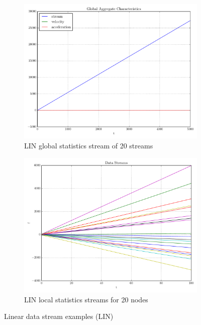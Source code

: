 \begin{figure}[t!]
\centering
\begin{subfigure}[t]{0.49\textwidth}
\centering
\includegraphics[scale=0.38, trim=2cm 0 0 0]{img/linear1D20N_global.pdf}
\caption{LIN global statistics stream of 20 streams}
\end{subfigure}
\begin{subfigure}[t]{0.49\textwidth}
\centering
\includegraphics[scale=0.38]{img/linear1D20N_streams.pdf}
\caption{LIN local statistics streams for 20 nodes} 
\end{subfigure}
\vspace{0.5cm}
\caption{Linear data stream examples (LIN)}\label{fig:linearStreams}
\end{figure}

